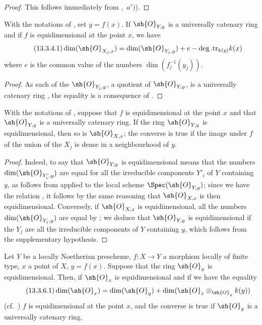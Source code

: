 \begin{proof}
This follows immediately from ,~$a')$).
\end{proof}

\begin{corollary}[13.3.4]
\label{IV.13.3.4}
With the notations of , set $y=f(x)$.
If $\sh{O}_{Y,y}$ is a universally catenary ring and if $f$ is equidimensional at the point $x$, we have
\[
\tag{13.3.4.1}
\label{IV.13.3.4.1}
  \dim(\sh{O}_{X_j,x})=\dim(\sh{O}_{Y_j,y})+e-\deg.\mathrm{tr}_{k(y)}k(x)
\]
where $e$ is the common value of the numbers $\dim(f_j^{-1}(y_j))$.
\end{corollary}

\begin{proof}
As each of the $\sh{O}_{Y_j,y}$, a quotient of $\sh{O}_{Y,y}$, is a universally catenary ring , the equality is a consequence of .
\end{proof}

\begin{corollary}[13.3.5]
\label{IV.13.3.5}
With the notations of , suppose that $f$ is equidimensional at the point $x$ and that $\sh{O}_{Y,y}$ is a universally catenary ring.
If the ring $\sh{O}_{Y,y}$ is equidimensional, then so is $\sh{O}_{X,x}$; the converse is true if the image under $f$ of the union of the $X_j$ is dense in a neighbourhood of $y$.
\end{corollary}

\begin{proof}
Indeed, to say that $\sh{O}_{Y,y}$ is equidimensional means that the numbers $\dim(\sh{O}_{Y'_i,y})$ are equal for all the irreducible components $Y'_i$ of $Y$ containing $y$, as follows from  applied to the local scheme $\Spec(\sh{O}_{Y,y})$; since we have the relation , it follows by the same reasoning that $\sh{O}_{X,x}$ is then equidimensional.
Conversely, if $\sh{O}_{X,x}$ is equidimensional, all the numbers $\dim(\sh{O}_{Y_j,y})$ are equal by ; we deduce that $\sh{O}_{Y,y}$ is equidimensional if the $Y_j$ are all the irreducible components of $Y$ containing $y$, which follows from the supplementary hypothesis.
\end{proof}

\begin{proposition}[13.3.6]
\label{IV.13.3.6}
Let $Y$ be a locally Noetherian prescheme, $f:X\to Y$ a morphism locally of finite type, $x$ a point of $X$, $y=f(x)$.
Suppose that the ring $\sh{O}_y$ is equidimensional. Then, if $\sh{O}_x$ is equidimensional and if we have the equality
\[
\tag{13.3.6.1}
\label{IV.13.3.6.1}
  \dim(\sh{O}_x)=\dim(\sh{O}_y)+\dim(\sh{O}_x\otimes_{\sh{O}_y}k(y))
\]
(cf.\ ) $f$ is equidimensional at the point $x$, and the converse is true if $\sh{O}_y$ is a universally catenary ring.
\end{proposition}

